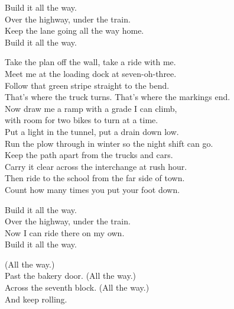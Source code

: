 \begin{lyrics}
Build it all the way.\\
Over the highway, under the train.\\
Keep the lane going all the way home.\\
Build it all the way.

Take the plan off the wall, take a ride with me.\\
Meet me at the loading dock at seven-oh-three.\\
Follow that green stripe straight to the bend.\\
That’s where the truck turns. That’s where the markings end.\\
Now draw me a ramp with a grade I can climb,\\
with room for two bikes to turn at a time.\\
Put a light in the tunnel, put a drain down low.\\
Run the plow through in winter so the night shift can go.\\
Keep the path apart from the trucks and cars.\\
Carry it clear across the interchange at rush hour.\\
Then ride to the school from the far side of town.\\
Count how many times you put your foot down.

Build it all the way.\\
Over the highway, under the train.\\
Now I can ride there on my own.\\
Build it all the way.

(All the way.)\\
Past the bakery door.
(All the way.)\\
Across the seventh block.
(All the way.)\\
And keep rolling.
\end{lyrics}

